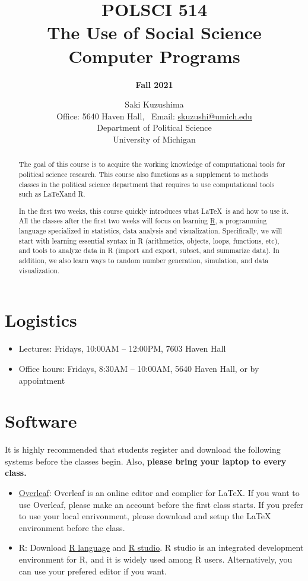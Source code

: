 \documentclass[11pt]{article}
\title{\bf POLSCI 514 \\ The Use of Social Science Computer Programs}
\author{\Large {\bf Fall 2021}}
\date{\large Saki Kuzushima \\ \medskip
  Office: 5640 Haven Hall, \ Email: \href{mailto:skuzushi@umich.edu}{skuzushi@umich.edu} \\ \medskip
  Department of Political Science \\ University of Michigan}
\begin{document}
\maketitle

\begin{abstract}
The goal of this course is to acquire the working knowledge of computational tools for political science research.
This course also functions as a supplement to methods classes in the political science department that requires to use computational tools such as \LaTeX and R.

In the first two weeks, this course quickly introduces what \LaTeX\ is and how to use it. 
All the classes after the first two weeks will focus on learning \href{https://www.r-proect.org/}{R}, a programming language specialized in statistics, data analysis and visualization.
Specifically, we will start with learning essential syntax in R (arithmetics, objects, loops, functions, etc), and tools to analyze data in R (import and export, subset, and summarize data).
In addition, we also learn ways to random number generation, simulation, and data visualization. 
\end{abstract}


\section{Logistics}

\begin{itemize}
\item Lectures: Fridays, 10:00AM -- 12:00PM, 7603 Haven Hall
\item Office hours: Fridays, 8:30AM -- 10:00AM, 5640 Haven Hall, or by appointment
\end{itemize}


\section{Software}

It is highly recommended that students register and download the following systems before the classes begin.
Also, \textbf{please bring your laptop to every class.}

\begin{itemize}
\item \href{https://www.overleaf.com/}{Overleaf}: Overleaf is an online editor and complier for \LaTeX. 
If you want to use Overleaf, please make an account before the first class starts.
If you prefer to use your local enrivonment, please download and setup the LaTeX environment before the class.

\item R: Download \href{https://www.r-project.org/}{R language} and \href{https://www.rstudio.com/}{R studio}. 
R studio is an integrated development environment for R, and it is widely used among R users.
Alternatively, you can use your prefered editor if you want.


\end{itemize} 
\end{document}
